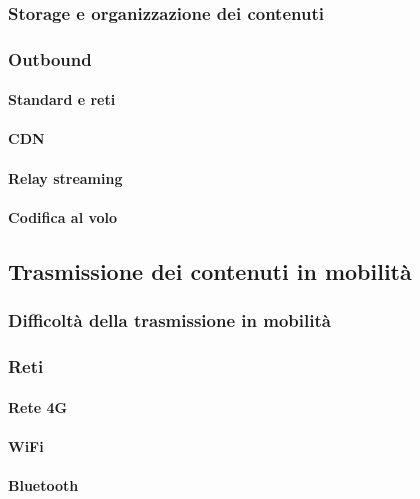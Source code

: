       \subsubsection{Storage e organizzazione dei contenuti}
      

      \subsubsection{Outbound}
         \paragraph{Standard e reti}

         \paragraph{CDN}

         \paragraph{Relay streaming}

         \paragraph{Codifica al volo}

   \subsection{Trasmissione dei contenuti in mobilità}
      \subsubsection{Difficoltà della trasmissione in mobilità}

      \subsubsection{Reti}
         \paragraph{Rete 4G}
         \paragraph{WiFi}
         \paragraph{Bluetooth}

